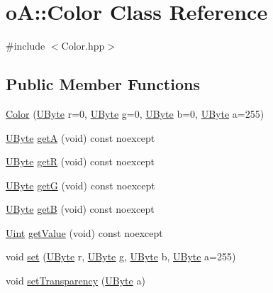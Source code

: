 \hypertarget{classo_a_1_1_color}{}\section{oA\+:\+:Color Class Reference}
\label{classo_a_1_1_color}


{\ttfamily \#include $<$Color.\+hpp$>$}

\subsection*{Public Member Functions}
\begin{DoxyCompactItemize}
\item 
\mbox{\hyperlink{classo_a_1_1_color_a62152f87069a3a2905086814012a3fea}{Color}} (\mbox{\hyperlink{namespaceo_a_a8c38e43a304d568b8495770dd8d50513}{U\+Byte}} r=0, \mbox{\hyperlink{namespaceo_a_a8c38e43a304d568b8495770dd8d50513}{U\+Byte}} g=0, \mbox{\hyperlink{namespaceo_a_a8c38e43a304d568b8495770dd8d50513}{U\+Byte}} b=0, \mbox{\hyperlink{namespaceo_a_a8c38e43a304d568b8495770dd8d50513}{U\+Byte}} a=255)
\item 
\mbox{\hyperlink{namespaceo_a_a8c38e43a304d568b8495770dd8d50513}{U\+Byte}} \mbox{\hyperlink{classo_a_1_1_color_a27cd67a64f4cc15f09fb7686890add8f}{getA}} (void) const noexcept
\item 
\mbox{\hyperlink{namespaceo_a_a8c38e43a304d568b8495770dd8d50513}{U\+Byte}} \mbox{\hyperlink{classo_a_1_1_color_af53e0f3c94638ab041fe05ce7356c2d8}{getR}} (void) const noexcept
\item 
\mbox{\hyperlink{namespaceo_a_a8c38e43a304d568b8495770dd8d50513}{U\+Byte}} \mbox{\hyperlink{classo_a_1_1_color_a3dcd5785db4a2c1a5a49a70d5378154a}{getG}} (void) const noexcept
\item 
\mbox{\hyperlink{namespaceo_a_a8c38e43a304d568b8495770dd8d50513}{U\+Byte}} \mbox{\hyperlink{classo_a_1_1_color_a8a30e79da1de484a4ff47ed2bcbc8e23}{getB}} (void) const noexcept
\item 
\mbox{\hyperlink{namespaceo_a_abe1d8250226c5cf34f84d7b75fc7922e}{Uint}} \mbox{\hyperlink{classo_a_1_1_color_ac010d6318a14cebb3123929159fbab93}{get\+Value}} (void) const noexcept
\item 
void \mbox{\hyperlink{classo_a_1_1_color_aaf0ba215d5bd4946f93a68bab2a8d66d}{set}} (\mbox{\hyperlink{namespaceo_a_a8c38e43a304d568b8495770dd8d50513}{U\+Byte}} r, \mbox{\hyperlink{namespaceo_a_a8c38e43a304d568b8495770dd8d50513}{U\+Byte}} g, \mbox{\hyperlink{namespaceo_a_a8c38e43a304d568b8495770dd8d50513}{U\+Byte}} b, \mbox{\hyperlink{namespaceo_a_a8c38e43a304d568b8495770dd8d50513}{U\+Byte}} a=255)
\item 
void \mbox{\hyperlink{classo_a_1_1_color_afa261cb70221d211e94a29b8f0484a02}{set\+Transparency}} (\mbox{\hyperlink{namespaceo_a_a8c38e43a304d568b8495770dd8d50513}{U\+Byte}} a)
\end{DoxyCompactItemize}
